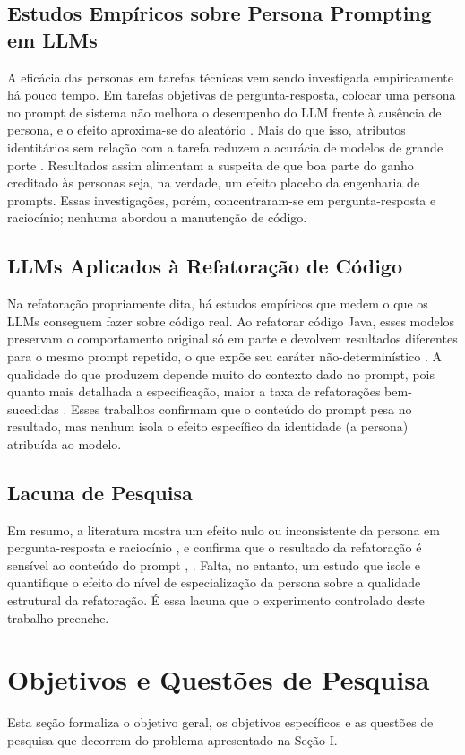 \documentclass[10pt,conference,a4paper,twocolumn]{article}
\begin{document}
\subsection{Estudos Empíricos sobre Persona Prompting em LLMs}
A eficácia das personas em tarefas técnicas vem sendo investigada empiricamente há pouco tempo. Em tarefas objetivas de pergunta-resposta, colocar uma persona no prompt de sistema não melhora o desempenho do LLM frente à ausência de persona, e o efeito aproxima-se do aleatório \cite{zheng2024}. Mais do que isso, atributos identitários sem relação com a tarefa reduzem a acurácia de modelos de grande porte \cite{araujo2025}. Resultados assim alimentam a suspeita de que boa parte do ganho creditado às personas seja, na verdade, um efeito placebo da engenharia de prompts. Essas investigações, porém, concentraram-se em pergunta-resposta e raciocínio; nenhuma abordou a manutenção de código.

\subsection{LLMs Aplicados à Refatoração de Código}
Na refatoração propriamente dita, há estudos empíricos que medem o que os LLMs conseguem fazer sobre código real. Ao refatorar código Java, esses modelos preservam o comportamento original só em parte e devolvem resultados diferentes para o mesmo prompt repetido, o que expõe seu caráter não-determinístico \cite{depalma2024}. A qualidade do que produzem depende muito do contexto dado no prompt, pois quanto mais detalhada a especificação, maior a taxa de refatorações bem-sucedidas \cite{liu2024}. Esses trabalhos confirmam que o conteúdo do prompt pesa no resultado, mas nenhum isola o efeito específico da identidade (a persona) atribuída ao modelo.

\subsection{Lacuna de Pesquisa}
Em resumo, a literatura mostra um efeito nulo ou inconsistente da persona em pergunta-resposta e raciocínio \cite{zheng2024}, \cite{araujo2025} e confirma que o resultado da refatoração é sensível ao conteúdo do prompt \cite{depalma2024}, \cite{liu2024}. Falta, no entanto, um estudo que isole e quantifique o efeito do nível de especialização da persona sobre a qualidade estrutural da refatoração. É essa lacuna que o experimento controlado deste trabalho preenche.

\section{Objetivos e Questões de Pesquisa}
Esta seção formaliza o objetivo geral, os objetivos específicos e as questões de pesquisa que decorrem do problema apresentado na Seção I.
\end{document}
